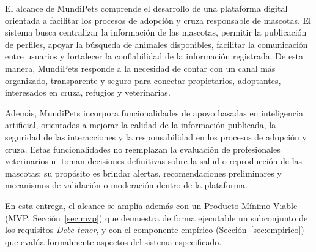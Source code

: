 \documentclass[journal,onecolumn]{IEEEtran}
\begin{document}
	El alcance de MundiPets comprende el desarrollo de una plataforma digital
	orientada a facilitar los procesos de adopción y cruza responsable de
	mascotas. El sistema busca centralizar la información de las mascotas,
	permitir la publicación de perfiles, apoyar la búsqueda de animales
	disponibles, facilitar la comunicación entre usuarios y fortalecer la
	confiabilidad de la información registrada. De esta manera, MundiPets responde
	a la necesidad de contar con un canal más organizado, transparente y seguro
	para conectar propietarios, adoptantes, interesados en cruza, refugios y
	veterinarias.
	
	Además, MundiPets incorpora funcionalidades de apoyo basadas en inteligencia
	artificial, orientadas a mejorar la calidad de la información publicada, la
	seguridad de las interacciones y la responsabilidad en los procesos de
	adopción y cruza. Estas funcionalidades no reemplazan la evaluación de
	profesionales veterinarios ni toman decisiones definitivas sobre la salud o
	reproducción de las mascotas; su propósito es brindar alertas, recomendaciones
	preliminares y mecanismos de validación o moderación dentro de la plataforma.
	
	En esta entrega, el alcance se amplía además con un Producto Mínimo Viable
	(MVP, Sección~\ref{sec:mvp}) que demuestra de forma ejecutable un subconjunto
	de los requisitos \emph{Debe tener}, y con el componente empírico
	(Sección~\ref{sec:empirico}) que evalúa formalmente aspectos del sistema
	especificado.
	
\end{document}
